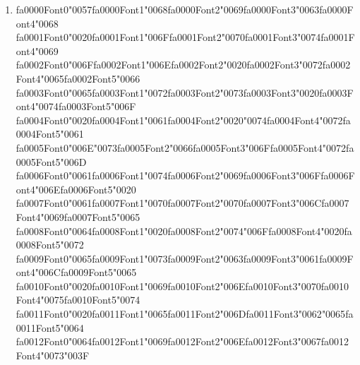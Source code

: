 \documentclass[11pt]{article}
\begin{document}
\begin{enumerate}[label=Q\arabic*., leftmargin=*]
\item {\csname fa0000Font0\endcsname\char"0057}{\csname fa0000Font1\endcsname\char"0068}{\csname fa0000Font2\endcsname\char"0069}{\csname fa0000Font3\endcsname\char"0063}{\csname fa0000Font4\endcsname\char"0068} {\csname fa0001Font0\endcsname\char"0020}{\csname fa0001Font1\endcsname\char"006F}{\csname fa0001Font2\endcsname\char"0070}{\csname fa0001Font3\endcsname\char"0074}{\csname fa0001Font4\endcsname\char"0069} {\csname fa0002Font0\endcsname\char"006F}{\csname fa0002Font1\endcsname\char"006E}{\csname fa0002Font2\endcsname\char"0020}{\csname fa0002Font3\endcsname\char"0072}{\csname fa0002Font4\endcsname\char"0065}{\csname fa0002Font5\endcsname\char"0066} {\csname fa0003Font0\endcsname\char"0065}{\csname fa0003Font1\endcsname\char"0072}{\csname fa0003Font2\endcsname\char"0073}{\csname fa0003Font3\endcsname\char"0020}{\csname fa0003Font4\endcsname\char"0074}{\csname fa0003Font5\endcsname\char"006F} {\csname fa0004Font0\endcsname\char"0020}{\csname fa0004Font1\endcsname\char"0061}{\csname fa0004Font2\endcsname\char"0020}{\char"0074}{\csname fa0004Font4\endcsname\char"0072}{\csname fa0004Font5\endcsname\char"0061} {\csname fa0005Font0\endcsname\char"006E}{\char"0073}{\csname fa0005Font2\endcsname\char"0066}{\csname fa0005Font3\endcsname\char"006F}{\csname fa0005Font4\endcsname\char"0072}{\csname fa0005Font5\endcsname\char"006D} {\csname fa0006Font0\endcsname\char"0061}{\csname fa0006Font1\endcsname\char"0074}{\csname fa0006Font2\endcsname\char"0069}{\csname fa0006Font3\endcsname\char"006F}{\csname fa0006Font4\endcsname\char"006E}{\csname fa0006Font5\endcsname\char"0020} {\csname fa0007Font0\endcsname\char"0061}{\csname fa0007Font1\endcsname\char"0070}{\csname fa0007Font2\endcsname\char"0070}{\csname fa0007Font3\endcsname\char"006C}{\csname fa0007Font4\endcsname\char"0069}{\csname fa0007Font5\endcsname\char"0065} {\csname fa0008Font0\endcsname\char"0064}{\csname fa0008Font1\endcsname\char"0020}{\csname fa0008Font2\endcsname\char"0074}{\char"006F}{\csname fa0008Font4\endcsname\char"0020}{\csname fa0008Font5\endcsname\char"0072} {\csname fa0009Font0\endcsname\char"0065}{\csname fa0009Font1\endcsname\char"0073}{\csname fa0009Font2\endcsname\char"0063}{\csname fa0009Font3\endcsname\char"0061}{\csname fa0009Font4\endcsname\char"006C}{\csname fa0009Font5\endcsname\char"0065} {\csname fa0010Font0\endcsname\char"0020}{\csname fa0010Font1\endcsname\char"0069}{\csname fa0010Font2\endcsname\char"006E}{\csname fa0010Font3\endcsname\char"0070}{\csname fa0010Font4\endcsname\char"0075}{\csname fa0010Font5\endcsname\char"0074} {\csname fa0011Font0\endcsname\char"0020}{\csname fa0011Font1\endcsname\char"0065}{\csname fa0011Font2\endcsname\char"006D}{\csname fa0011Font3\endcsname\char"0062}{\char"0065}{\csname fa0011Font5\endcsname\char"0064} {\csname fa0012Font0\endcsname\char"0064}{\csname fa0012Font1\endcsname\char"0069}{\csname fa0012Font2\endcsname\char"006E}{\csname fa0012Font3\endcsname\char"0067}{\csname fa0012Font4\endcsname\char"0073}{\char"003F}


\end{enumerate}
\end{document}
